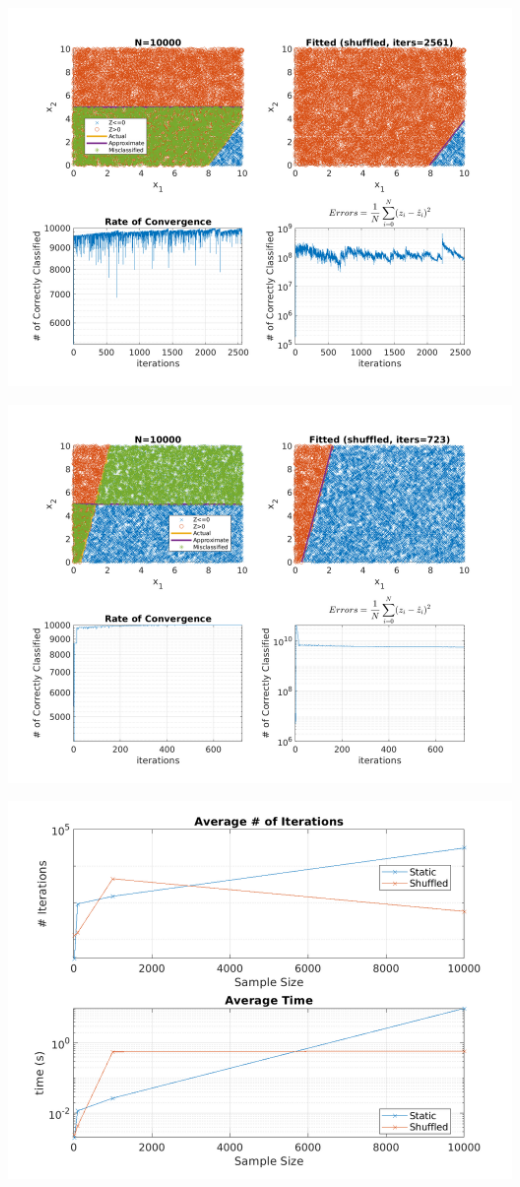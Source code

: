 \documentclass{article}
\newenvironment{Figure}
  {\par\medskip\noindent\minipage{\linewidth}}
  {\endminipage\par\medskip}
\begin{document}
\begin{multicols}{2}
\begin{Figure}
\end{Figure}
\begin{Figure}
\centering
\includegraphics[width=\linewidth]{pngs/n10000_shuffled4.png}
\end{Figure}
\begin{Figure}
\centering
\includegraphics[width=\linewidth]{pngs/n10000_shuffled5.png}
\end{Figure}

\end{multicols}

\begin{Figure}
\centering
\includegraphics[width=\linewidth]{pngs/details.png}
\end{Figure}
\end{document}
